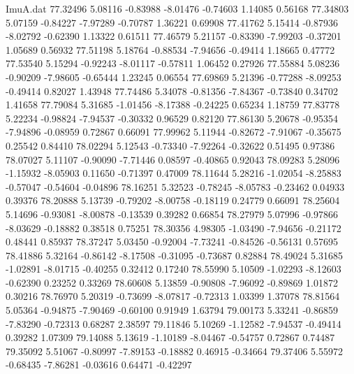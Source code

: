 \begin{filecontents}{ImuA.dat}
  77.32496    5.08116   -0.83988   -8.01476   -0.74603    1.14085    0.56168
  77.34803    5.07159   -0.84227   -7.97289   -0.70787    1.36221    0.69908
  77.41762    5.15414   -0.87936   -8.02792   -0.62390    1.13322    0.61511
  77.46579    5.21157   -0.83390   -7.99203   -0.37201    1.05689    0.56932
  77.51198    5.18764   -0.88534   -7.94656   -0.49414    1.18665    0.47772
  77.53540    5.15294   -0.92243   -8.01117   -0.57811    1.06452    0.27926
  77.55884    5.08236   -0.90209   -7.98605   -0.65444    1.23245    0.06554
  77.69869    5.21396   -0.77288   -8.09253   -0.49414    0.82027    1.43948
  77.74486    5.34078   -0.81356   -7.84367   -0.73840    0.34702    1.41658
  77.79084    5.31685   -1.01456   -8.17388   -0.24225    0.65234    1.18759
  77.83778    5.22234   -0.98824   -7.94537   -0.30332    0.96529    0.82120
  77.86130    5.20678   -0.95354   -7.94896   -0.08959    0.72867    0.66091
  77.99962    5.11944   -0.82672   -7.91067   -0.35675    0.25542    0.84410
  78.02294    5.12543   -0.73340   -7.92264   -0.32622    0.51495    0.97386
  78.07027    5.11107   -0.90090   -7.71446    0.08597   -0.40865    0.92043
  78.09283    5.28096   -1.15932   -8.05903    0.11650   -0.71397    0.47009
  78.11644    5.28216   -1.02054   -8.25883   -0.57047   -0.54604   -0.04896
  78.16251    5.32523   -0.78245   -8.05783   -0.23462    0.04933    0.39376
  78.20888    5.13739   -0.79202   -8.00758   -0.18119    0.24779    0.66091
  78.25604    5.14696   -0.93081   -8.00878   -0.13539    0.39282    0.66854
  78.27979    5.07996   -0.97866   -8.03629   -0.18882    0.38518    0.75251
  78.30356    4.98305   -1.03490   -7.94656   -0.21172    0.48441    0.85937
  78.37247    5.03450   -0.92004   -7.73241   -0.84526   -0.56131    0.57695
  78.41886    5.32164   -0.86142   -8.17508   -0.31095   -0.73687    0.82884
  78.49024    5.31685   -1.02891   -8.01715   -0.40255    0.32412    0.17240
  78.55990    5.10509   -1.02293   -8.12603   -0.62390    0.23252    0.33269
  78.60608    5.13859   -0.90808   -7.96092   -0.89869    1.01872    0.30216
  78.76970    5.20319   -0.73699   -8.07817   -0.72313    1.03399    1.37078
  78.81564    5.05364   -0.94875   -7.90469   -0.60100    0.91949    1.63794
  79.00173    5.33241   -0.86859   -7.83290   -0.72313    0.68287    2.38597
  79.11846    5.10269   -1.12582   -7.94537   -0.49414    0.39282    1.07309
  79.14088    5.13619   -1.10189   -8.04467   -0.54757    0.72867    0.74487
  79.35092    5.51067   -0.80997   -7.89153   -0.18882    0.46915   -0.34664
  79.37406    5.55972   -0.68435   -7.86281   -0.03616    0.64471   -0.42297

\end{filecontents}
